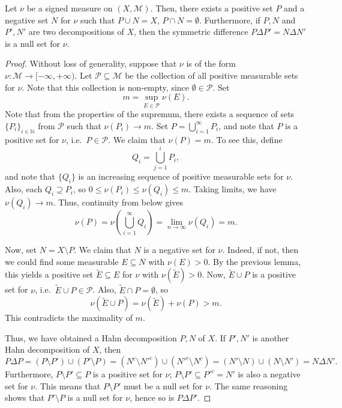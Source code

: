 \documentclass[11pt]{article}
\newcommand{\N}{\mathbb{N}}
\newcommand{\M}{\mathcal{M}}
\theoremstyle{definition}
\theoremstyle{remark}
\begin{document}
    \begin{theorem}\label{theorem:hahn_decomposition}
        Let $\nu$ be a signed measure on $(X, \M)$. Then, there exists a positive set
        $P$ and a negative set $N$ for $\nu$ such that $P \cup N = X$, $P \cap N =
        \emptyset$. Furthermore, if $P, N$ and $P', N'$ are two decompositions of
        $X$, then the symmetric difference $P\Delta P' = N\Delta N'$ is a null set
        for $\nu$.
    \end{theorem}
    \begin{proof}
        Without loss of generality, suppose that $\nu$ is of the form $\nu\colon \M
        \to [-\infty, +\infty)$. Let $\mathscr{P} \subseteq \M$ be the collection of
        all positive measurable sets for $\nu$. Note that this collection is
        non-empty, since $\emptyset \in \mathscr{P}$. Set \[
            m = \sup_{E \in \mathscr{P}} \nu(E).
        \] Note that from the properties of the supremum, there exists a sequence of
        sets $\{P_i\}_{i \in \N}$ from $\mathscr{P}$ such that $\nu(P_i) \to m$. Set
        $P = \bigcup_{i = 1}^\infty P_i$, and note that $P$ is a positive set for
        $\nu$, i.e.\ $P \in \mathscr{P}$. We claim that $\nu(P) = m$. To see this,
        define \[
            Q_i = \bigcup_{j = 1}^i P_i,
        \] and note that $\{Q_i\}$ is an increasing sequence of positive measurable
        sets for $\nu$. Also, each $Q_i \supseteq P_i$, so $0 \leq \nu(P_i) \leq
        \nu(Q_i) \leq m$. Taking limits, we have $\nu(Q_i) \to m$. Thus, continuity
        from below gives \[
            \nu(P) = \nu\left(\bigcup_{i = 1}^\infty Q_i\right) = \lim_{n \to \infty}
            \nu(Q_i) = m.
        \]

        Now, set $N = X\setminus P$. We claim that $N$ is a negative set for $\nu$.
        Indeed, if not, then we could find some measurable $E \subseteq N$ with
        $\nu(E) > 0$. By the previous lemma, this yields a positive set $\tilde{E}
        \subseteq E$ for $\nu$ with $\nu(\tilde{E}) > 0$. Now, $\tilde{E} \cup P$ is
        a positive set for $\nu$, i.e.\ $\tilde{E} \cup P \in \mathscr{P}$. Also,
        $\tilde{E} \cap P = \emptyset$, so \[
            \nu(\tilde{E} \cup P) = \nu(\tilde{E}) + \nu(P) > m.
        \] This contradicts the maximality of $m$.

        Thus, we have obtained a Hahn decomposition $P, N$ of $X$. If $P', N'$ is
        another Hahn decomposition of $X$, then \[
            P\Delta P = (P\setminus P') \cup (P'\setminus P) = (N^c\setminus N'^c)
            \cup (N'^c\setminus N^c) = (N'\setminus N) \cup (N\setminus N') = N\Delta
            N'.
        \] Furthermore, $P\setminus P' \subseteq P$ is a positive set for $\nu$;
        $P\setminus P' \subseteq P'^c = N'$ is also a negative set for $\nu$. This
        means that $P\setminus P'$ must be a null set for $\nu$. The same reasoning
        shows that $P'\setminus P$ is a null set for $\nu$, hence so is $P\Delta P'$.
    \end{proof}
\end{document}
